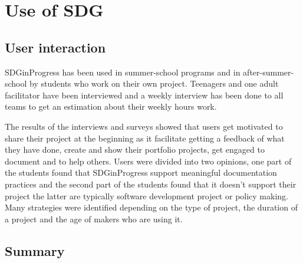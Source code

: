\section{Use of SDG}

\subsection{User interaction}
SDGinProgress has been used in summer-school programs and in after-summer-school by students who work on their own project. Teenagers and one adult facilitator have been interviewed and a weekly interview has been done to all teams to get an estimation about their weekly hours work.

The results of the interviews and surveys showed that users get motivated to share their project at the beginning as it facilitate getting a feedback of what they have done, create and show their portfolio projects, get engaged to document and to help others. Users were divided into two opinions, one part of the students found that SDGinProgress support meaningful documentation practices and the second part of the students found that it doesn't support their project the latter are typically software development project or policy making. Many strategies were identified depending on the type of project, the duration of a project and the age of makers who are using it.

\subsection{Summary}

